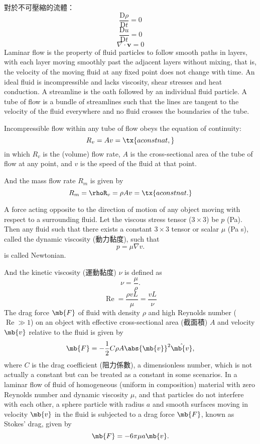 \documentclass[a4paper,12pt]{article}
\begin{document}
對於不可壓縮的流體：
\[\frac{\mathrm{D}\rho}{\mathrm{D}t}=0\]
\[\frac{\mathrm{D}u}{\mathrm{D}t}=0\]
\[\nabla\cdot\mathbf{v}=0\]
Laminar flow is the property of fluid particles to follow smooth paths in layers, with each layer moving smoothly past the adjacent layers without mixing, that is, the velocity of the moving fluid at any fixed point does not change with time.
An ideal fluid is incompressible and lacks viscosity, shear stresses and heat conduction.
A streamline is the oath followed by an individual fluid particle.
A tube of flow is a bundle of streamlines such that the lines are tangent to the velocity of the fluid everywhere and no fluid crosses the boundaries of the tube.

Incompressible flow within any tube of flow obeys the equation of continuity:
\[R_v=Av=\tx{a constnat,}\]
in which $R_v$ is the (volume) flow rate, $A$ is the cross-sectional area of the tube of flow at any point, and $v$ is the speed of the fluid at that point.

And the mass flow rate $R_m$ is given by
\[R_m=\rhoR_v=\rho Av=\tx{a constnat.}\]


A force acting opposite to the direction of motion of any object moving with respect to a surrounding fluid.
Let the viscous stress tensor ($3\times 3$) be $p$ (Pa). Then any fluid such that there exists a constant $3\times 3$ tensor or scalar $\mu$ (Pa s), called the dynamic viscosity (動力黏度), such that
\[p=\mu\nabla v.\]
is called Newtonian.

And the kinetic viscosity (運動黏度) $\nu$ is defined as
\[\nu=\frac{\mu}{\rho}.\]
\[\operatorname{Re}=\frac{\rho v L}{\mu}=\frac{v L}{\nu}\]
The drag force $\mb{F}$ of fluid with density $\rho$ and high Reynolds number ($\operatorname{Re}\gg 1$) on an object with effective cross-sectional area (截面積) $A$ and velocity $\mb{v}$ relative to the fluid is given by
\[\mb{F}=-\frac{1}{2}C\rho A\abs{\mb{v}}^2\hat{\mb{v}},\]
where $C$ is the drag coefficient (阻力係數), a dimensionless number, which is not actually a constant but can be treated as a constant in some scenarios.
In a laminar flow of fluid of homogeneous (uniform in composition) material with zero Reynolds number and dynamic viscosity $\mu$, and that particles do not interfere with each other, a sphere particle with radius $a$ and smooth surfaces moving in velocity $\mb{v}$ in the fluid is subjected to a drag force $\mb{F}$, known as Stokes' drag, given by
\[\mb{F}=-6\pi\mu a\mb{v}.\]
\end{document}
